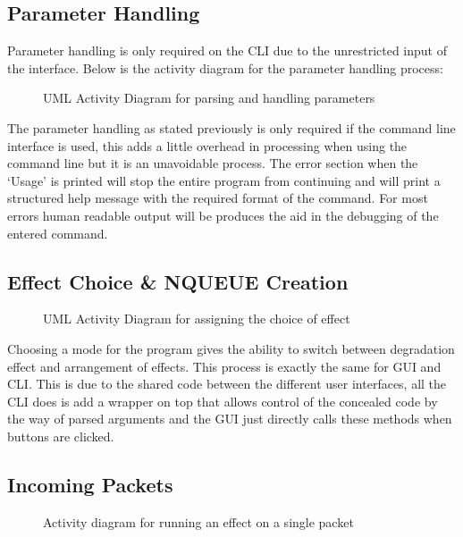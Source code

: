 \subsection{Parameter Handling}
Parameter handling is only required on the CLI due to the unrestricted input of the interface. Below is the activity diagram for the parameter handling process:

\begin{center}
	
	\begin{figure}[h]
		\caption{UML Activity Diagram for parsing and handling parameters}
	\end{figure}	
\end{center}

The parameter handling as stated previously is only required if the command line interface is used, this adds a little overhead in processing when using the command line but it is an unavoidable process. The error section when the `Usage' is printed will stop the entire program from continuing and will print a structured help message with the required format of the command. For most errors human readable output will be produces the aid in the debugging of the entered command.

\subsection{Effect Choice \& NQUEUE Creation}

\begin{center}
	
	\begin{figure}[h]
		\caption{UML Activity Diagram for assigning the choice of effect}
	\end{figure}
\end{center}


Choosing a mode for the program gives the ability to switch between degradation effect and arrangement of effects. This process is exactly the same for GUI and CLI. This is due to the shared code between the different user interfaces, all the CLI does is add a wrapper on top that allows control of the concealed code by the way of parsed arguments and the GUI just directly calls these methods when buttons are clicked.

\subsection{Incoming Packets}
\begin{center}
	
	\begin{figure}[h]
		\caption{Activity diagram for running an effect on a single packet}
	\end{figure}
\end{center}

